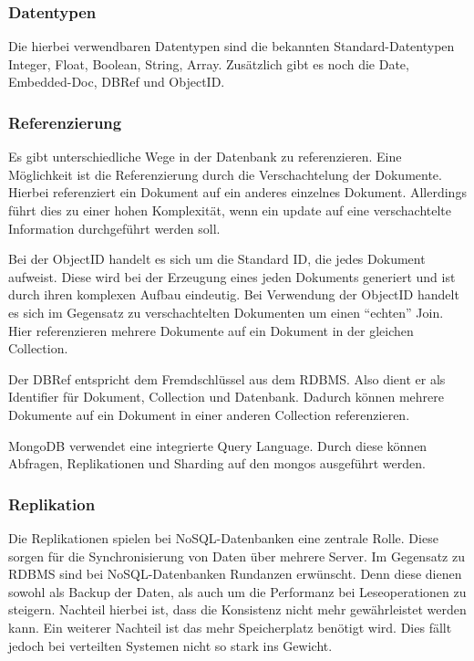 \subsubsection{Datentypen}
Die hierbei verwendbaren Datentypen sind die bekannten Standard-Datentypen
Integer, Float, Boolean, String, Array. Zusätzlich gibt es noch die Date, Embedded-Doc, DBRef und
ObjectID.

\subsubsection{Referenzierung}
Es gibt unterschiedliche Wege in der Datenbank zu referenzieren.
Eine Möglichkeit ist die Referenzierung durch die Verschachtelung der Dokumente.
Hierbei referenziert ein Dokument auf ein anderes einzelnes Dokument.
Allerdings führt dies zu einer hohen Komplexität, wenn ein update auf
eine verschachtelte Information durchgeführt werden soll.

Bei der ObjectID handelt es sich um die Standard ID, die jedes Dokument
aufweist. Diese wird bei der Erzeugung eines jeden Dokuments generiert
und ist durch ihren komplexen Aufbau eindeutig. Bei Verwendung der
ObjectID handelt es sich im Gegensatz zu verschachtelten Dokumenten um
einen ``echten'' Join. Hier referenzieren mehrere Dokumente auf ein Dokument
in der gleichen Collection.

Der DBRef entspricht dem Fremdschlüssel aus dem
RDBMS. Also dient er als Identifier für Dokument, Collection und
Datenbank. Dadurch können mehrere Dokumente auf ein Dokument in einer anderen
Collection referenzieren.

MongoDB verwendet eine integrierte Query Language. Durch
diese können Abfragen, Replikationen und Sharding auf den mongos ausgeführt werden.

\subsubsection{Replikation}
Die Replikationen spielen bei NoSQL-Datenbanken eine zentrale Rolle. Diese sorgen für die Synchronisierung von Daten über mehrere
Server. Im Gegensatz zu RDBMS sind bei NoSQL-Datenbanken Rundanzen erwünscht.
Denn diese dienen sowohl als Backup der Daten, als auch um die Performanz bei
Leseoperationen zu steigern. Nachteil hierbei ist, dass die Konsistenz nicht mehr gewährleistet werden kann.
Ein weiterer Nachteil ist das mehr Speicherplatz benötigt wird. Dies fällt jedoch bei
verteilten Systemen nicht so stark ins Gewicht.

